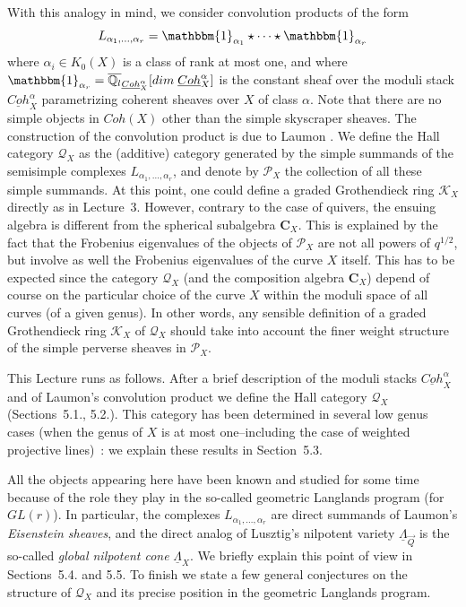 \documentclass[a4paper,10pt]{amsart}
\def\a{\alpha}
\def\qlb{\overline{\mathbb{Q}_l}}
\numberwithin{equation}{section}
\begin{document}
With this analogy in mind, we consider convolution products of the form
$$L_{\a_1, \ldots, \a_r}=\mathbbm{1}_{\a_1} \star \cdots \star \mathbbm{1}_{\a_r}$$
where $\a_i \in K_0(X)$ is a class of rank at most one, and where $\mathbbm{1}_{\a_r}=\qlb_{\underline{Coh}^{\a}_X}[dim\;\underline{Coh}^{\a}_X]$ is the constant sheaf over the moduli stack $\underline{Coh}^{\a}_X$ parametrizing coherent sheaves over $X$ of class $\a$. Note that there are no simple objects in $Coh(X)$ other than the simple skyscraper sheaves. The construction of the convolution product is due to Laumon \cite{Laumon}. We define the Hall category $\mathcal{Q}_X$ as the (additive) category generated by the simple summands of the semisimple complexes $L_{\a_1, \ldots, \a_r}$, and denote by $\mathcal{P}_X$ the collection of all these simple summands. At this point, one could define a graded Grothendieck ring $\mathcal{K}_X$ directly as in Lecture~3. However, contrary to the case of quivers, the ensuing algebra is different from the spherical subalgebra $\mathbf{C}_X$. This is explained by the fact that the Frobenius eigenvalues of the 
objects of $\mathcal{P}_X$ are not all powers of $q^{1/2}$, but involve as well the Frobenius eigenvalues of the curve $X$ itself. This has to be expected since the category $\mathcal{Q}_X$ (and the composition algebra $\mathbf{C}_X$) depend of course on the particular choice of the curve $X$ within the moduli space of all curves (of a given genus). In other words, any sensible definition of a graded Grothendieck ring $\mathcal{K}_X$ of $\mathcal{Q}_X$ should take into account the finer weight structure of the simple perverse sheaves in $\mathcal{P}_X$.

\vspace{.1in}

This Lecture runs as follows. After a brief description of the moduli stacks $\underline{Coh}^{\a}_X$ and of Laumon's convolution product we define the Hall category $\mathcal{Q}_X$ (Sections~5.1., 5.2.). This category has been determined in several low genus cases (when the genus of $X$ is at  most one--including the case of weighted projective lines)~: we explain these results in Section~5.3. 

All the objects appearing here have been known and studied for some time because of the role they play in the so-called geometric Langlands program (for $GL(r)$). In particular, the complexes $L_{\a_1, \ldots, \a_r}$ are direct summands of Laumon's \textit{Eisenstein sheaves}, and
the direct analog of Lusztig's nilpotent variety $\underline{\Lambda}_{\vec{Q}}$ is the so-called \textit{global nilpotent cone} $\underline{\Lambda}_X$. We briefly explain this point of view in Sections~5.4. and 5.5. To finish we state a few general conjectures on the structure of $\mathcal{Q}_X$ and its precise position in the geometric Langlands program.
\end{document}
